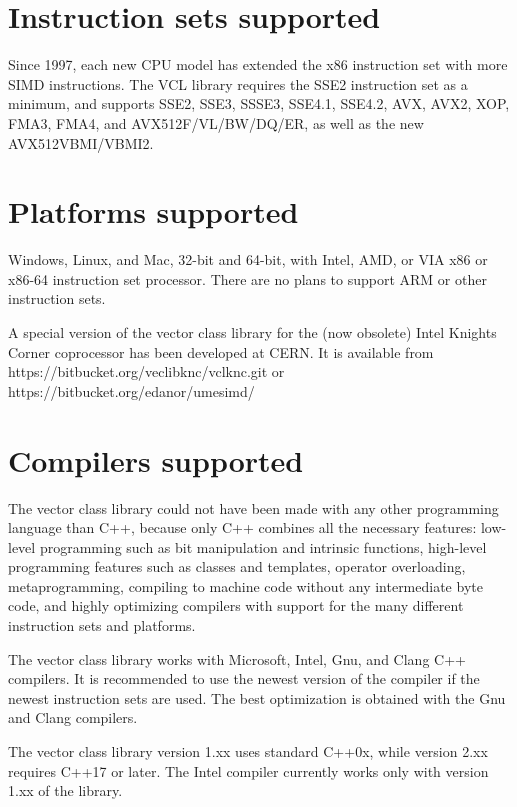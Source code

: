 \documentclass[vcl_manual.tex]{subfiles}
\begin{document}
\section{Instruction sets supported} \label{InstructionSetsSupported}
Since 1997, each new CPU model has extended the x86 instruction set with more SIMD instructions. The VCL library requires the SSE2 instruction set as a minimum, and supports SSE2, SSE3, SSSE3, SSE4.1, SSE4.2, AVX, AVX2, XOP, FMA3, FMA4, and AVX512F/VL/BW/DQ/ER, as well as the new AVX512VBMI/VBMI2.

\section{Platforms supported} \label{PlatformsSupported}
Windows, Linux, and Mac, 32-bit and 64-bit, with Intel, AMD, or VIA x86 or x86-64 instruction set processor. There are no plans to support ARM or other instruction sets.

A special version of the vector class library for the (now obsolete) Intel Knights Corner coprocessor has been developed at CERN. It is available from
https://bitbucket.org/veclibknc/vclknc.git or 
https://bitbucket.org/edanor/umesimd/

\section{Compilers supported} \label{CompilersSupported}
The vector class library could not have been made with any other programming language than C++, because only C++ combines all the necessary features: low-level programming such as bit manipulation and intrinsic functions, high-level programming features such as classes and templates, operator overloading, metaprogramming, compiling to machine code without any intermediate byte code, and highly optimizing compilers with support for the many different instruction sets and platforms.

The vector class library works with Microsoft, Intel, Gnu, and Clang C++ compilers. It is recommended to use the newest version of the compiler if the newest instruction sets are used. The best optimization is obtained with the Gnu and Clang compilers.

The vector class library version 1.xx uses standard C++0x, while version 2.xx requires C++17 or later. The Intel compiler currently works only with version 1.xx of the library.
\end{document}
